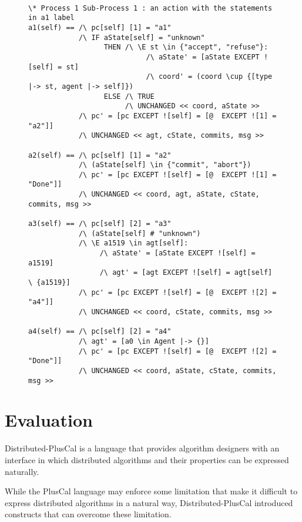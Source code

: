 \documentclass{thesul}
\begin{document}
\begin{enumerate}
\FloatBarrier
\begin{figure}
\begin{lstlisting}[caption = TLA+ translation for Sub-Processes, frame = tlrb, firstnumber = 1]

\* Process 1 Sub-Process 1 : an action with the statements in a1 label
a1(self) == /\ pc[self] [1] = "a1"
            /\ IF aState[self] = "unknown"
                  THEN /\ \E st \in {"accept", "refuse"}:
                            /\ aState' = [aState EXCEPT ![self] = st]
                            /\ coord' = (coord \cup {[type |-> st, agent |-> self]})
                  ELSE /\ TRUE
                       /\ UNCHANGED << coord, aState >>
            /\ pc' = [pc EXCEPT ![self] = [@  EXCEPT ![1] = "a2"]]
            /\ UNCHANGED << agt, cState, commits, msg >>

a2(self) == /\ pc[self] [1] = "a2"
            /\ (aState[self] \in {"commit", "abort"})
            /\ pc' = [pc EXCEPT ![self] = [@  EXCEPT ![1] = "Done"]]
            /\ UNCHANGED << coord, agt, aState, cState, commits, msg >>

a3(self) == /\ pc[self] [2] = "a3"
            /\ (aState[self] # "unknown")
            /\ \E a1519 \in agt[self]:
                 /\ aState' = [aState EXCEPT ![self] = a1519]
                 /\ agt' = [agt EXCEPT ![self] = agt[self] \ {a1519}]
            /\ pc' = [pc EXCEPT ![self] = [@  EXCEPT ![2] = "a4"]]
            /\ UNCHANGED << coord, cState, commits, msg >>

a4(self) == /\ pc[self] [2] = "a4"
            /\ agt' = [a0 \in Agent |-> {}]
            /\ pc' = [pc EXCEPT ![self] = [@  EXCEPT ![2] = "Done"]]
            /\ UNCHANGED << coord, aState, cState, commits, msg >>
\end{lstlisting}
\end{figure}
\FloatBarrier

\end{enumerate}


\section{Evaluation}

Distributed-PlusCal is a language that provides algorithm designers with an interface in which distributed algorithms and their properties can be expressed naturally.

While the PlusCal language may enforce some limitation that make it difficult to express distributed algorithms in a natural way, Distributed-PlusCal introduced constructs that can overcome these limitation.
\end{document}
